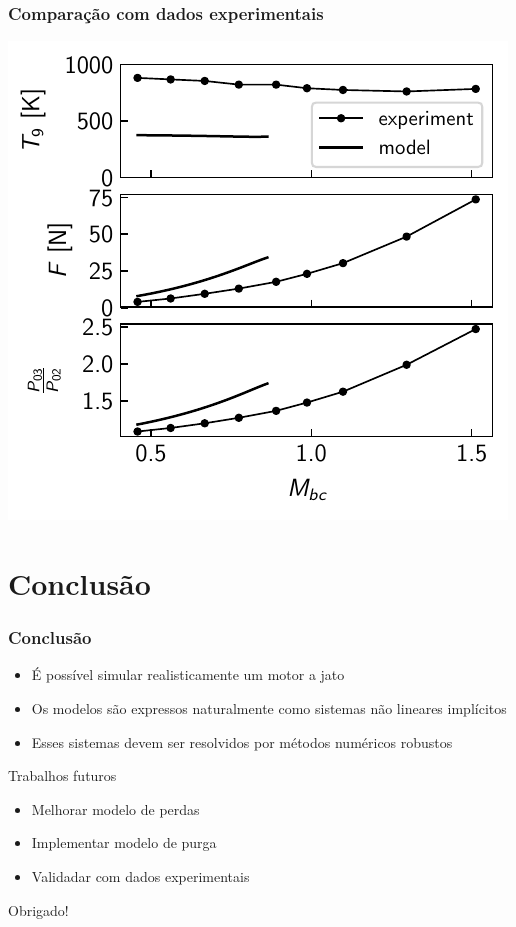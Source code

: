 \documentclass[aspectratio=1610]{beamer}
\begin{document}
\begin{frame}
    \frametitle{Comparação com dados experimentais}
    \centering
    \includegraphics[width=\paperwidth, height=0.95\textheight, keepaspectratio]{fig/experimental_presentation}
\end{frame}

\section{Conclusão}
\begin{frame}
    \frametitle{Conclusão}
    \begin{itemize}
        \item É possível simular realisticamente um motor a jato
        \item Os modelos são expressos naturalmente como sistemas não lineares implícitos
        \item Esses sistemas devem ser resolvidos por métodos numéricos robustos
    \end{itemize}
    \vfill
    \begin{block}{Trabalhos futuros}
        \begin{itemize}
            \item Melhorar modelo de perdas
            \item Implementar modelo de purga
            \item Validadar com dados experimentais
        \end{itemize}
    \end{block}
\end{frame}

\begin{frame}
    \huge Obrigado!
\end{frame}
\end{document}
